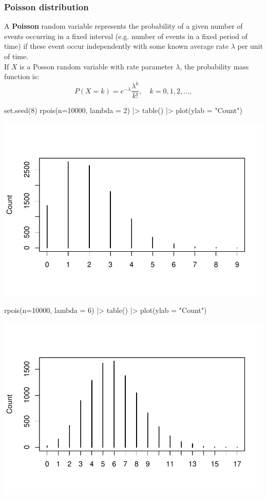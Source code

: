 \documentclass[a4paper]{article}
\begin{document}
\subsubsection{Poisson distribution}
A \textbf{Poisson} random variable represents the probability of a given number of events occurring in a fixed interval (e.g. number of events in a fixed period of time) if these event occur independently with some known average rate \( \lambda \) per unit of time.\\
If \( X \) is a Posson random variable with rate parameter \( \lambda \), the probability mass function is:
\[
	P(X = k) = e^{-\lambda} \frac{\lambda^k}{k!}, \quad k=0,1,2,\dotsc,
\]
\begin{Schunk}
\begin{Sinput}
set.seed(8)
rpois(n=10000, lambda = 2) |>
  table() |>
plot(ylab = "Count")	
\end{Sinput}


{\centering \includegraphics[width=\maxwidth]{figure/listings-unnamed-chunk-31-1} 

}

\begin{Sinput}
rpois(n=10000, lambda = 6) |>
  table() |>
plot(ylab = "Count")
\end{Sinput}


{\centering \includegraphics[width=\maxwidth]{figure/listings-unnamed-chunk-31-2} 

}

\end{Schunk}
\end{document}
